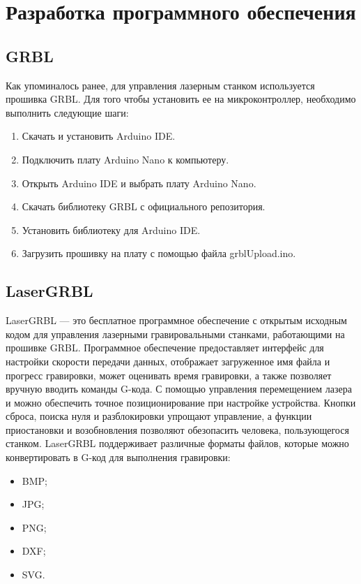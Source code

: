 \section{Разработка программного обеспечения}
\label{sec:software}

\subsection{GRBL}
Как упоминалось ранее, для управления лазерным станком используется прошивка GRBL.
Для того чтобы установить ее на микроконтроллер, необходимо выполнить следующие шаги:

\begin{enumerate}
    \item Скачать и установить Arduino IDE.
    \item Подключить плату Arduino Nano к компьютеру.
    \item Открыть Arduino IDE и выбрать плату Arduino Nano.
    \item Скачать библиотеку GRBL с официального репозитория.
    \item Установить библиотеку для Arduino IDE.
    \item Загрузить прошивку на плату с помощью файла grblUpload.ino.
\end{enumerate}

\subsection{LaserGRBL}
LaserGRBL — это бесплатное программное обеспечение с открытым исходным кодом для управления лазерными гравировальными станками,
работающими на прошивке GRBL\cite{laserGRBL}. Программное обеспечение предоставляет интерфейс для настройки скорости передачи данных, 
отображает загруженное имя файла и прогресс гравировки, может оценивать время гравировки, а также позволяет вручную вводить команды G-кода. 
С помощью управления перемещением лазера и можно обеспечить точное позиционирование при настройке устройства. 
Кнопки сброса, поиска нуля и разблокировки упрощают управление, 
а функции приостановки и возобновления позволяют обезопасить человека, пользующегося станком.  
LaserGRBL поддерживает различные форматы файлов, которые можно конвертировать 
в G-код для выполнения гравировки:

\begin{itemize}
    \item BMP;
    \item JPG;
    \item PNG;
    \item DXF;
    \item SVG.
\end{itemize}


